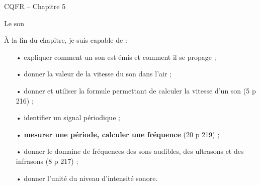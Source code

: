 \documentclass[12pt,a5paper]{article}
\begin{document}
\begin{header}
CQFR -- Chapitre 5

Le son
\end{header}

À la fin du chapitre, je suis capable de :
\begin{itemize}
\item[•] expliquer comment un son est émis et comment il se propage ;
\item[•] donner la valeur de la vitesse du son dans l'air ;
\item[•] donner et utiliser la formule permettant de calculer la vitesse d'un son (5 p 216) ;
\item[•] identifier un signal périodique ;
\item[•] \textbf{mesurer une période, calculer une fréquence} (20 p 219) ;
\item[•] donner le domaine de fréquences des sons audibles, des ultrasons et des infrasons (8 p 217) ;
\item[•] donner l'unité du niveau d'intensité sonore.
\end{itemize}
\end{document}
